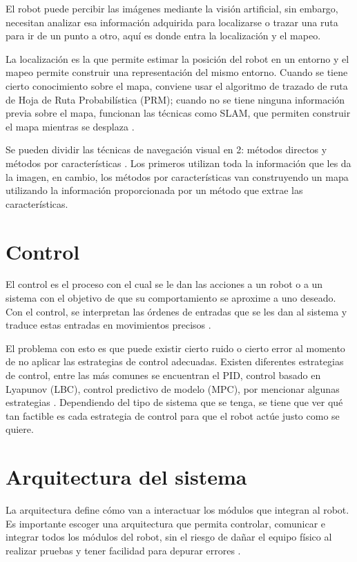 El robot puede percibir las imágenes mediante la visión artificial, sin embargo, necesitan analizar esa información adquirida para localizarse o trazar una ruta para ir de un punto a otro, aquí es donde entra la localización y el mapeo.

La localización es la que permite estimar la posición del robot en un entorno y el mapeo permite construir una representación del mismo entorno. Cuando se tiene cierto conocimiento sobre el mapa, conviene usar el algoritmo de trazado de ruta de Hoja de Ruta Probabilística (PRM); cuando no se tiene ninguna información previa sobre el mapa, funcionan las técnicas como SLAM, que permiten construir el mapa mientras se desplaza \cite{MT7}. 

Se pueden dividir las técnicas de navegación visual en 2: métodos directos y métodos por características \cite{MT8}. Los primeros utilizan toda la información que les da la imagen, en cambio, los métodos por características van construyendo un mapa utilizando la información proporcionada por un método que extrae las características.


\section{Control}
\label{sec:control}

El control es el proceso con el cual se le dan las acciones a un robot o a un sistema con el objetivo de que su comportamiento se aproxime a uno deseado. Con el control, se interpretan las órdenes de entradas que se les dan al sistema y traduce estas entradas en movimientos precisos \cite{MT9}.

El problema con esto es que puede existir cierto ruido o cierto error al momento de no aplicar las estrategias de control adecuadas. Existen diferentes estrategias de control, entre las más comunes se encuentran el PID, control basado en Lyapunov (LBC), control predictivo de modelo (MPC), por mencionar algunas estrategias \cite{MT10}. Dependiendo del tipo de sistema que se tenga, se tiene que ver qué tan factible es cada estrategia de control para que el robot actúe justo como se quiere.

\section{Arquitectura del sistema}
\label{sec:arq-del-sistema}

La arquitectura define cómo van a interactuar los módulos que integran al robot. Es importante escoger una arquitectura que permita controlar, comunicar e integrar todos los módulos del robot, sin el riesgo de dañar el equipo físico al realizar pruebas y tener facilidad para depurar errores \cite{MT11}.


